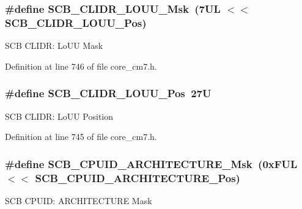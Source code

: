 \subsubsection[{\texorpdfstring{S\+C\+B\+\_\+\+C\+L\+I\+D\+R\+\_\+\+L\+O\+U\+U\+\_\+\+Msk}{SCB_CLIDR_LOUU_Msk}}]{\setlength{\rightskip}{0pt plus 5cm}\#define S\+C\+B\+\_\+\+C\+L\+I\+D\+R\+\_\+\+L\+O\+U\+U\+\_\+\+Msk~(7\+U\+L $<$$<$ S\+C\+B\+\_\+\+C\+L\+I\+D\+R\+\_\+\+L\+O\+U\+U\+\_\+\+Pos)}\hypertarget{group___c_m_s_i_s___s_c_b_ga4a2124def29e03f85d8ab6b455f5a174}{}\label{group___c_m_s_i_s___s_c_b_ga4a2124def29e03f85d8ab6b455f5a174}
S\+CB C\+L\+I\+DR\+: Lo\+UU Mask 

Definition at line 746 of file core\+\_\+cm7.\+h.

\subsubsection[{\texorpdfstring{S\+C\+B\+\_\+\+C\+L\+I\+D\+R\+\_\+\+L\+O\+U\+U\+\_\+\+Pos}{SCB_CLIDR_LOUU_Pos}}]{\setlength{\rightskip}{0pt plus 5cm}\#define S\+C\+B\+\_\+\+C\+L\+I\+D\+R\+\_\+\+L\+O\+U\+U\+\_\+\+Pos~27U}\hypertarget{group___c_m_s_i_s___s_c_b_ga384f04641b96d74495e023cca27ed72f}{}\label{group___c_m_s_i_s___s_c_b_ga384f04641b96d74495e023cca27ed72f}
S\+CB C\+L\+I\+DR\+: Lo\+UU Position 

Definition at line 745 of file core\+\_\+cm7.\+h.

\subsubsection[{\texorpdfstring{S\+C\+B\+\_\+\+C\+P\+U\+I\+D\+\_\+\+A\+R\+C\+H\+I\+T\+E\+C\+T\+U\+R\+E\+\_\+\+Msk}{SCB_CPUID_ARCHITECTURE_Msk}}]{\setlength{\rightskip}{0pt plus 5cm}\#define S\+C\+B\+\_\+\+C\+P\+U\+I\+D\+\_\+\+A\+R\+C\+H\+I\+T\+E\+C\+T\+U\+R\+E\+\_\+\+Msk~(0x\+F\+U\+L $<$$<$ S\+C\+B\+\_\+\+C\+P\+U\+I\+D\+\_\+\+A\+R\+C\+H\+I\+T\+E\+C\+T\+U\+R\+E\+\_\+\+Pos)}\hypertarget{group___c_m_s_i_s___s_c_b_gafae4a1f27a927338ae9dc51a0e146213}{}\label{group___c_m_s_i_s___s_c_b_gafae4a1f27a927338ae9dc51a0e146213}
S\+CB C\+P\+U\+ID\+: A\+R\+C\+H\+I\+T\+E\+C\+T\+U\+RE Mask 

